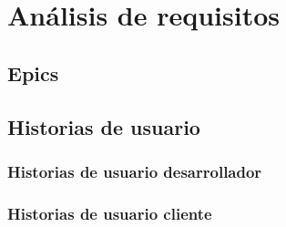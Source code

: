 
\chapter{Análisis de requisitos}


\section{Epics}


\section{Historias de usuario}


\subsection{Historias de usuario desarrollador}


\subsection{Historias de usuario cliente}


